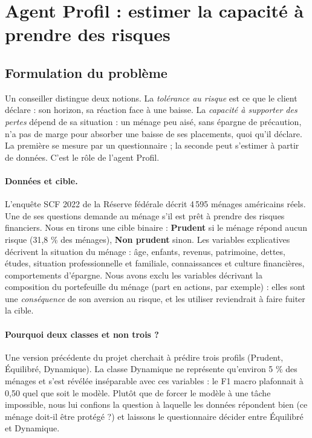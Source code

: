 \section{Agent Profil : estimer la capacité à prendre des risques}
\label{sec:profil}

\subsection{Formulation du problème}

Un conseiller distingue deux notions. La \emph{tolérance au risque} est ce que le client déclare : son horizon, sa réaction face à une baisse. La \emph{capacité à supporter des pertes} dépend de sa situation : un ménage peu aisé, sans épargne de précaution, n'a pas de marge pour absorber une baisse de ses placements, quoi qu'il déclare. La première se mesure par un questionnaire ; la seconde peut s'estimer à partir de données. C'est le rôle de l'agent Profil.

\paragraph{Données et cible.} L'enquête SCF 2022 de la Réserve fédérale décrit 4\,595 ménages américains réels. Une de ses questions demande au ménage s'il est prêt à prendre des risques financiers. Nous en tirons une cible binaire : \textbf{Prudent} si le ménage répond \og aucun risque \fg{} (31,8 \% des ménages), \textbf{Non prudent} sinon. Les variables explicatives décrivent la situation du ménage : âge, enfants, revenus, patrimoine, dettes, études, situation professionnelle et familiale, connaissances et culture financières, comportements d'épargne. Nous avons exclu les variables décrivant la composition du portefeuille du ménage (part en actions, par exemple) : elles sont une \emph{conséquence} de son aversion au risque, et les utiliser reviendrait à faire fuiter la cible.

\paragraph{Pourquoi deux classes et non trois ?} Une version précédente du projet cherchait à prédire trois profils (Prudent, Équilibré, Dynamique). La classe Dynamique ne représente qu'environ 5 \% des ménages et s'est révélée inséparable avec ces variables : le F1 macro plafonnait à 0,50 quel que soit le modèle. Plutôt que de forcer le modèle à une tâche impossible, nous lui confions la question à laquelle les données répondent bien (ce ménage doit-il être protégé ?) et laissons le questionnaire décider entre Équilibré et Dynamique.

